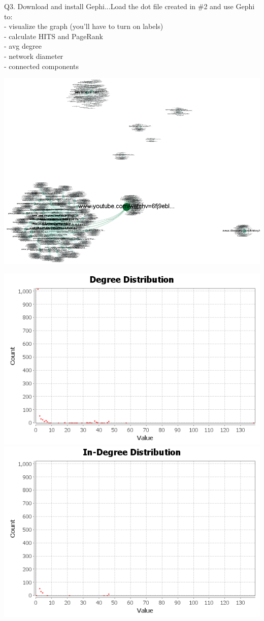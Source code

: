 \documentclass{article}
\begin{document}
Q3. Download and install Gephi...Load the dot file created in \#2 and use Gephi
to:\\
- visualize the graph (you'll have to turn on labels)\\
- calculate HITS and PageRank\\
- avg degree\\
- network diameter\\
- connected components\\
\graphicspath{{q3/}}
\includegraphics[scale=.5]{graph.png} \\
\graphicspath{{q3/avgDegree/}}
\includegraphics[scale=.5]{degree-distribution.png} \\
\includegraphics[scale=.5]{indegree-distribution.png} \\
\end{document}
